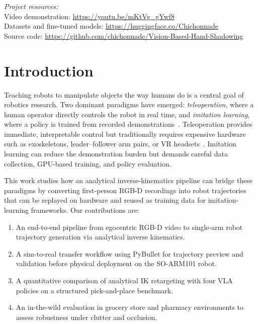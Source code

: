 \documentclass[10pt,journal]{IEEEtran}
\begin{document}
\begin{center}
\begin{minipage}{0.98\linewidth}
\footnotesize
\raggedright
\textit{Project resources:}\\
Video demonstration: \url{https://youtu.be/mKtVg_gYwf8}\\
Datasets and fine-tuned models: \url{https://huggingface.co/Chichonnade}\\
Source code: \url{https://github.com/chichonnade/Vision-Based-Hand-Shadowing}
\end{minipage}
\end{center}

\section{Introduction}
\label{sec:introduction}
Teaching robots to manipulate objects the way humans do is a
central goal of robotics research. Two dominant paradigms have emerged:
\emph{teleoperation}, where a human operator directly controls the robot
in real time, and \emph{imitation learning}, where a policy is trained
from recorded demonstrations~\cite{zhao2023act,cadena2025smolvla}.
Teleoperation provides immediate, interpretable control but traditionally
requires expensive hardware such as exoskeletons, leader--follower arm
pairs, or VR headsets~\cite{cheng2025opentv,ding2024bunny}. Imitation
learning can reduce the demonstration burden but demands careful data
collection, GPU-based training, and policy evaluation.

This work studies how an analytical inverse-kinematics pipeline can
bridge these paradigms by converting first-person RGB-D recordings into
robot trajectories that can be replayed on hardware and reused as
training data for imitation-learning frameworks.
Our contributions are:

\begin{enumerate}
  \item An end-to-end pipeline from egocentric RGB-D video
        to single-arm robot trajectory generation via analytical inverse
        kinematics.
  \item A sim-to-real transfer workflow using PyBullet for trajectory
        preview and validation before physical deployment on the
        SO-ARM101 robot.
  \item A quantitative comparison of analytical IK retargeting with
        four VLA policies on a structured pick-and-place benchmark.
  \item An in-the-wild evaluation in grocery store and pharmacy
        environments to assess robustness under clutter and occlusion.
\end{enumerate}
\end{document}
